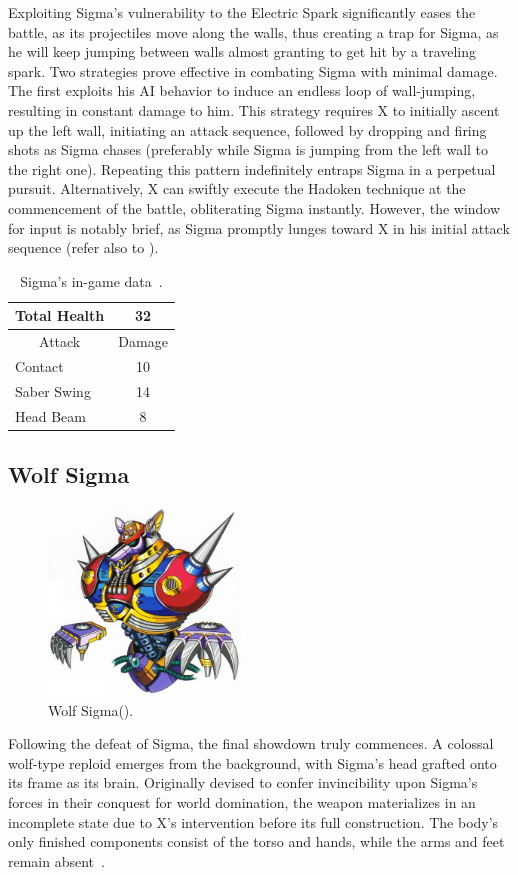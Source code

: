 Exploiting Sigma's vulnerability to the Electric Spark significantly eases the battle, as its projectiles move along the walls, thus creating a trap for Sigma, as he will keep jumping between walls almost granting to get hit by a traveling spark. Two strategies prove effective in combating Sigma with minimal damage. The first exploits his AI behavior to induce an endless loop of wall-jumping, resulting in constant damage to him. This strategy requires  X to initially ascent up the left wall, initiating an attack sequence, followed by dropping and firing shots as Sigma chases (preferably while Sigma is jumping from the left wall to the right one). Repeating this pattern indefinitely entraps Sigma in a perpetual pursuit. Alternatively, X can swiftly execute the Hadoken technique at the commencement of the battle, obliterating Sigma instantly. However, the window for input is notably brief, as Sigma promptly lunges toward X in his initial attack sequence (refer also to ).

\begin{table}[htp]
	\centering  
	\begin{tabular}[h]{l c}
		\toprule
		Total Health  & 32\\
		\midrule
		\multicolumn{1}{c}{Attack} & \multicolumn{1}{c}{Damage}\\
		Contact & 10\\
		Saber Swing & 14\\
		Head Beam& 8\\
		\bottomrule
	\end{tabular}
	\caption{Sigma's in-game data~\cite{wiki:Sigma}.}
\end{table}

\subsection{Wolf Sigma}\label{boss:wolf_sigma}
\begin{figure}[htp]
	\centering
	\includegraphics[height=5cm]{figures/X1/Sigma_stages/WolfSigma.jpg}
	\caption{Wolf Sigma(\cite{book:MMX_Complete_art}).}
\end{figure}
Following the defeat of Sigma, the final showdown truly commences. A colossal wolf-type reploid emerges from the background, with Sigma's head grafted onto its frame as its brain. Originally devised to confer invincibility upon Sigma's forces in their conquest for world domination, the weapon materializes in an incomplete state due to X's intervention before its full construction. The body's only finished components consist of the torso and hands, while the arms and feet remain absent~\cite{wayback:X_resources}.

